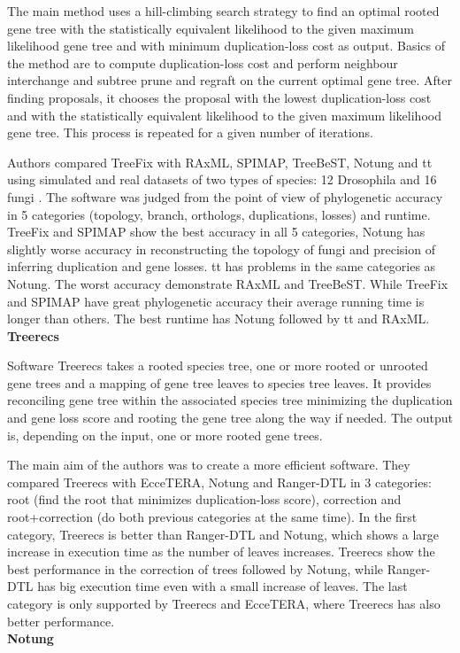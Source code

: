 The main method \cite{treefix} uses a hill-climbing search strategy to find an optimal rooted gene tree with the statistically equivalent likelihood to the given maximum likelihood gene tree and with minimum duplication-loss cost as output. Basics of the method are to compute duplication-loss cost and perform neighbour interchange and subtree prune and regraft on the current optimal gene tree. After finding proposals, it chooses the proposal with the lowest duplication-loss cost and with the statistically equivalent likelihood to the given maximum likelihood gene tree. This process is repeated for a given number of iterations.

Authors compared TreeFix with RAxML, SPIMAP, TreeBeST, Notung and tt using simulated and real datasets of two types of species: 12 Drosophila and 16 fungi \cite{treefix_online}. The software was judged from the point of view of phylogenetic accuracy in 5 categories (topology, branch, orthologs, duplications, losses) and runtime. TreeFix and SPIMAP show the best accuracy in all 5 categories, Notung has slightly worse accuracy in reconstructing the topology of fungi and precision of inferring duplication and gene losses. tt has problems in the same categories as Notung. The worst accuracy demonstrate RAxML and TreeBeST. While TreeFix and SPIMAP have great phylogenetic accuracy their average running time is longer than others. The best runtime has Notung followed by tt and RAxML.\\
\textbf{Treerecs} 

Software Treerecs \cite{treerecs_tutorial} takes a rooted species tree, one or more rooted or unrooted gene trees and a mapping of gene tree leaves to species tree leaves. It provides reconciling gene tree within the associated species tree minimizing the duplication and gene loss score and rooting the gene tree along the way if needed. The output is, depending on the input, one or more rooted gene trees.

The main aim of the authors was to create a more efficient software. They compared Treerecs with EcceTERA, Notung and Ranger-DTL in 3 categories: root (find the root that minimizes duplication-loss score), correction and root+correction (do both previous categories at the same time). In the first category, Treerecs is better than Ranger-DTL and Notung, which shows a large increase in execution time as the number of leaves increases. Treerecs show the best performance in the correction of trees followed by Notung, while Ranger-DTL has big execution time even with a small increase of leaves. The last category is only supported by Treerecs and EcceTERA, where Treerecs has also better performance.\\
\textbf{Notung}  

